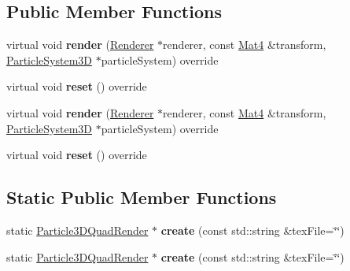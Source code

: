 \subsection*{Public Member Functions}
\begin{DoxyCompactItemize}
\item 
\mbox{\label{classParticle3DQuadRender_ac49685be71375c65d08bbeab9ae5abd6}} 
virtual void {\bfseries render} (\hyperlink{classRenderer}{Renderer} $\ast$renderer, const \hyperlink{classMat4}{Mat4} \&transform, \hyperlink{classParticleSystem3D}{Particle\+System3D} $\ast$particle\+System) override
\item 
\mbox{\label{classParticle3DQuadRender_a57eda554a089868da2ad728a0be66401}} 
virtual void {\bfseries reset} () override
\item 
\mbox{\label{classParticle3DQuadRender_a78f42145f55babd7e6065152bd78760f}} 
virtual void {\bfseries render} (\hyperlink{classRenderer}{Renderer} $\ast$renderer, const \hyperlink{classMat4}{Mat4} \&transform, \hyperlink{classParticleSystem3D}{Particle\+System3D} $\ast$particle\+System) override
\item 
\mbox{\label{classParticle3DQuadRender_aee140f190b04ee864b2361337fd14e0c}} 
virtual void {\bfseries reset} () override
\end{DoxyCompactItemize}
\subsection*{Static Public Member Functions}
\begin{DoxyCompactItemize}
\item 
\mbox{\label{classParticle3DQuadRender_af2470c61dff2d37001baf406b46b34ec}} 
static \hyperlink{classParticle3DQuadRender}{Particle3\+D\+Quad\+Render} $\ast$ {\bfseries create} (const std\+::string \&tex\+File=\char`\"{}\char`\"{})
\item 
\mbox{\label{classParticle3DQuadRender_af3474297166937c2f2a676c069666b47}} 
static \hyperlink{classParticle3DQuadRender}{Particle3\+D\+Quad\+Render} $\ast$ {\bfseries create} (const std\+::string \&tex\+File=\char`\"{}\char`\"{})
\end{DoxyCompactItemize}
